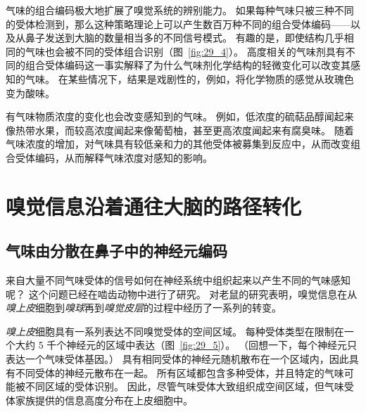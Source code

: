 气味的组合编码极大地扩展了嗅觉系统的辨别能力。
如果每种气味只被三种不同的受体检测到，那么这种策略理论上可以产生数百万种不同的组合受体编码——以及从鼻子发送到大脑的数量相当多的不同信号模式。
有趣的是，即使结构几乎相同的气味也会被不同的受体组合识别（图~\ref{fig:29_4}）。
高度相关的气味剂具有不同的组合受体编码这一事实解释了为什么气味剂化学结构的轻微变化可以改变其感知的气味。
在某些情况下，结果是戏剧性的，例如，将化学物质的感觉从玫瑰色变为酸味。


有气味物质浓度的变化也会改变感知到的气味。
例如，低浓度的硫萜品醇闻起来像热带水果，而较高浓度闻起来像葡萄柚，甚至更高浓度闻起来有腐臭味。
随着气味浓度的增加，对气味具有较低亲和力的其他受体被募集到反应中，从而改变组合受体编码，从而解释气味浓度对感知的影响。



\section{嗅觉信息沿着通往大脑的路径转化}

\subsection{气味由分散在鼻子中的神经元编码}

来自大量不同气味受体的信号如何在神经系统中组织起来以产生不同的气味感知呢？
这个问题已经在啮齿动物中进行了研究。
对老鼠的研究表明，嗅觉信息在从\textit{嗅上皮}细胞到\textit{嗅球}再到\textit{嗅觉皮层}的过程中经历了一系列的转变。


\textit{嗅上皮}细胞具有一系列表达不同嗅觉受体的空间区域。
每种受体类型在限制在一个大约 5 千个神经元的区域中表达（图~\ref{fig:29_5}）。
（回想一下，每个神经元只表达一个气味受体基因。）
具有相同受体的神经元随机散布在一个区域内，因此具有不同受体的神经元散布在一起。
所有区域都包含多种受体，并且特定的气味可能被不同区域的受体识别。
因此，尽管气味受体大致组织成空间区域，但气味受体家族提供的信息高度分布在上皮细胞中。


